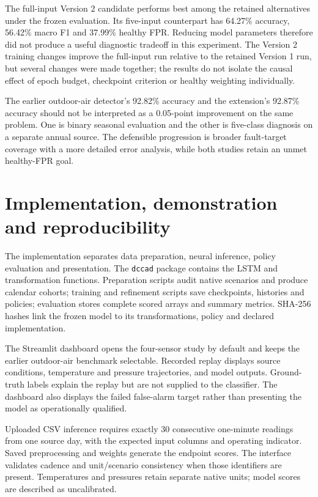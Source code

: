 The full-input Version 2 candidate performs best among the retained alternatives under the frozen evaluation. Its five-input counterpart has 64.27\% accuracy, 56.42\% macro F1 and 37.99\% healthy FPR. Reducing model parameters therefore did not produce a useful diagnostic tradeoff in this experiment. The Version 2 training changes improve the full-input run relative to the retained Version 1 run, but several changes were made together; the results do not isolate the causal effect of epoch budget, checkpoint criterion or healthy weighting individually.

The earlier outdoor-air detector's 92.82\% accuracy and the extension's 92.87\% accuracy should not be interpreted as a 0.05-point improvement on the same problem. One is binary seasonal evaluation and the other is five-class diagnosis on a separate annual source. The defensible progression is broader fault-target coverage with a more detailed error analysis, while both studies retain an unmet healthy-FPR goal.

\section{Implementation, demonstration and reproducibility}
The implementation separates data preparation, neural inference, policy evaluation and presentation. The \texttt{dccad} package contains the LSTM and transformation functions. Preparation scripts audit native scenarios and produce calendar cohorts; training and refinement scripts save checkpoints, histories and policies; evaluation stores complete scored arrays and summary metrics. SHA-256 hashes link the frozen model to its transformations, policy and declared implementation.

The Streamlit dashboard opens the four-sensor study by default and keeps the earlier outdoor-air benchmark selectable. Recorded replay displays source conditions, temperature and pressure trajectories, and model outputs. Ground-truth labels explain the replay but are not supplied to the classifier. The dashboard also displays the failed false-alarm target rather than presenting the model as operationally qualified.

Uploaded CSV inference requires exactly 30 consecutive one-minute readings from one source day, with the expected input columns and operating indicator. Saved preprocessing and weights generate the endpoint scores. The interface validates cadence and unit/scenario consistency when those identifiers are present. Temperatures and pressures retain separate native units; model scores are described as uncalibrated.

